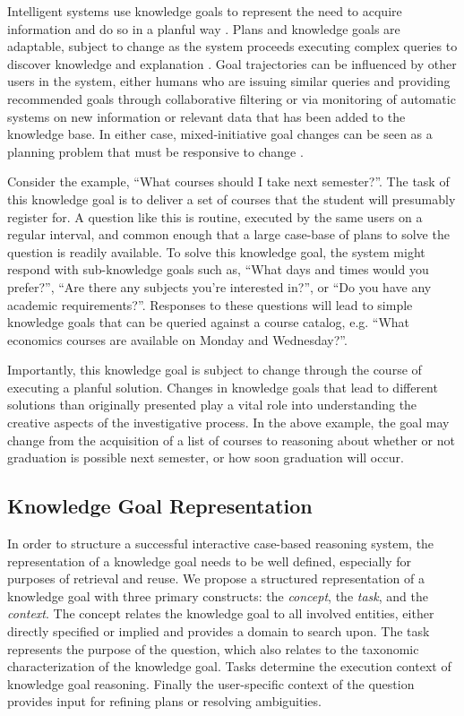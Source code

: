 \documentclass[11pt,letterpaper]{article}
\begin{document}
Intelligent systems use knowledge goals to represent the need to acquire information and do so in a planful way \cite{ram_goal-based_1991}. Plans and knowledge goals are adaptable, subject to change as the system proceeds executing complex queries to discover knowledge and explanation \cite{munoz-avila_case-based_2008}. Goal trajectories can be influenced by other users in the system, either humans who are issuing similar queries and providing recommended goals through collaborative filtering \cite{hayes_case-based_2001} or via monitoring of automatic systems on new information or relevant data that has been added to the knowledge base. In either case, mixed-initiative goal changes can be seen as a planning problem that must be responsive to change \cite{cox_mixed-initiative_2007}.

Consider the example, “What courses should I take next semester?”. The task of this knowledge goal is to deliver a set of courses that the student will presumably register for. A question like this is routine, executed by the same users on a regular interval, and common enough that a large case-base of plans to solve the question is readily available. To solve this knowledge goal, the system might respond with sub-knowledge goals such as, “What days and times would you prefer?”, “Are there any subjects you're interested in?”, or “Do you have any academic requirements?”. Responses to these questions will lead to simple knowledge goals that can be queried against a course catalog, e.g. “What economics courses are available on Monday and Wednesday?”.

Importantly, this knowledge goal is subject to change through the course of executing a planful solution. Changes in knowledge goals that lead to different solutions than originally presented play a vital role into understanding the creative aspects of the investigative process. In the above example, the goal may change from the acquisition of a list of courses to reasoning about whether or not graduation is possible next semester, or how soon graduation will occur.

\subsection{Knowledge Goal Representation}

In order to structure a successful interactive case-based reasoning system, the representation of a knowledge goal needs to be well defined, especially for purposes of retrieval and reuse. We propose a structured representation of a knowledge goal with three primary constructs: the \textit{concept}, the \textit{task}, and the \textit{context}. The concept relates the knowledge goal to all involved entities, either directly specified or implied and provides a domain to search upon. The task represents the purpose of the question, which also relates to the taxonomic characterization of the knowledge goal. Tasks determine the execution context of knowledge goal reasoning. Finally the user-specific context of the question provides input for refining plans or resolving ambiguities.
\end{document}
